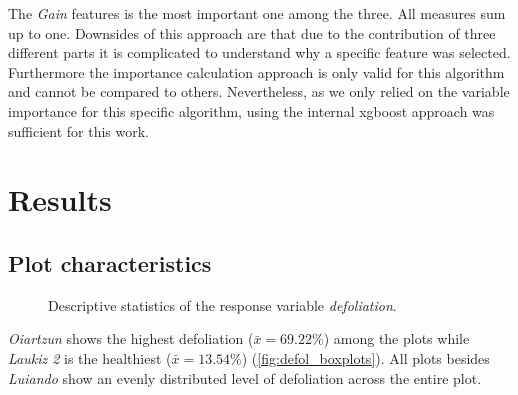 \documentclass[review]{elsarticle}
\begin{document}
The \textit{Gain} features is the most important one among the three. 
All measures sum up to one.
Downsides of this approach are that due to the contribution of three different parts it is complicated to understand why a specific feature was selected.
Furthermore the importance calculation approach is only valid for this algorithm and cannot be compared to others.
Nevertheless, as we only relied on the variable importance for this specific algorithm, using the internal xgboost approach was sufficient for this work.


\section{Results}

\subsection{Plot characteristics}

\begin{figure} [t!]
	\begin{center}
		\caption{Descriptive statistics of the response variable \textit{defoliation}.}
		\label{fig:defol_boxplots}
	\end{center}
\end{figure}

\textit{Oiartzun} shows the highest defoliation ($\bar{x} = 69.22 \%$) among the plots while \textit{Laukiz 2} is the healthiest ($\bar{x} = 13.54 \%$) (\autoref{fig:defol_boxplots}).
All plots besides \textit{Luiando} show an evenly distributed level of defoliation across the entire plot.
\end{document}
